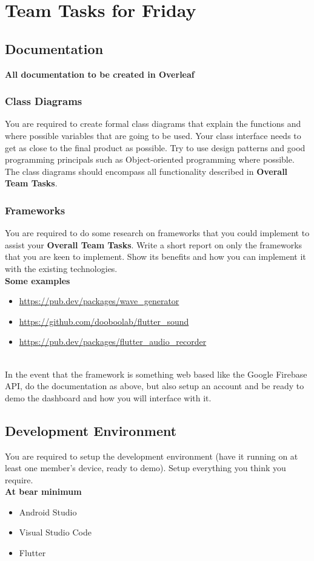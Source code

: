 \documentclass{article}
\begin{document}
\newpage



\section{Team Tasks for Friday}

\subsection{Documentation}
\textbf{All documentation to be created in Overleaf}

\subsubsection{Class Diagrams}
You are required to create formal class diagrams that explain the functions and where possible variables that are going to be used. Your class interface needs to get as close to the final product as possible. Try to use design patterns and good programming principals such as Object-oriented programming where possible. The class diagrams should encompass all functionality described in \textbf{Overall Team Tasks}.

\subsubsection{Frameworks}
You are required to do some research on frameworks that you could implement to assist your \textbf{Overall Team Tasks}. Write a short report on only the frameworks that you are keen to implement. Show its benefits and how you can implement it with the existing technologies. \\

\textbf{Some examples}
\begin{itemize}
    \item \url{https://pub.dev/packages/wave_generator}
    \item \url{https://github.com/dooboolab/flutter_sound}
    \item \url{https://pub.dev/packages/flutter_audio_recorder}
\end{itemize}
\\
In the event that the framework is something web based like the Google Firebase API, do the documentation as above, but also setup an account and be ready to demo the dashboard and how you will interface with it.

\subsection{Development Environment}
You are required to setup the development environment (have it running on at least one member's device, ready to demo). Setup everything you think you require. \\
\newline
\textbf{At bear minimum}
\begin{itemize}
    \item Android Studio
    \item Visual Studio Code
    \item Flutter
\end{itemize}
\end{document}
